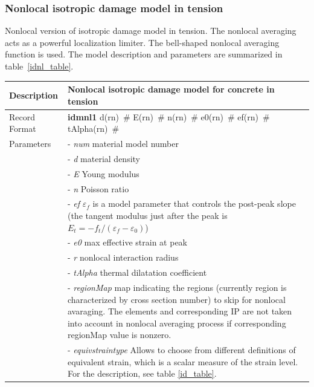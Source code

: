 \documentclass[epsf,a4paper]{article}
\newcommand{\descitem}[1]{{\noindent \bf #1}}
\newcommand{\elemparam}[2]{{{#1\tiny (#2)}~\#}}
\newcommand{\param}[1]{{\it #1}}
\begin{document}
\subsubsection{Nonlocal isotropic damage model in tension}
Nonlocal version of isotropic damage model in tension. 
The nonlocal averaging acts as a powerful localization
limiter. The bell-shaped nonlocal averaging function is used.
The model description and parameters are summarized
in table~\ref{idnl_table}.


\begin{table}[h]                                                                
\begin{tabular}{|l|p{9cm}|}                                                      
\hline                                                                          
Description & Nonlocal isotropic damage model  for concrete in tension\\
\hline                                                                          
Record Format & \descitem{idmnl1} \elemparam{d}{rn} \elemparam{E}{rn}
\elemparam{n}{rn}  \elemparam{e0}{rn}
\elemparam{ef}{rn} \elemparam{tAlpha}{rn} \\
Parameters &- \param{num} material model number\\
&- \param{d} material density\\
&- \param{E} Young modulus\\
&- \param{n} Poisson ratio\\
&- \param{ef} $\varepsilon_f$ is a model parameter that controls
the post-peak slope (the tangent modulus just after the peak is
$E_t=-f_t/(\varepsilon_f-\varepsilon_0)$)\\
&- \param{e0} max effective strain at peak\\
&- \param{r} nonlocal interaction radius\\
&- \param{tAlpha} thermal dilatation coefficient\\
&- \param{regionMap} map indicating the regions (currently region is
characterized by cross section number) to skip for nonlocal
avaraging. The elements and corresponding IP are not taken into
account in nonlocal averaging process if corresponding regionMap
value is nonzero.\\
&- \param{equivstraintype} Allows to choose from different definitions
of equivalent strain, which is a scalar measure of the strain
level. For the description, see table \ref{id_table}.\\

\end{tabular}
\end{table}
\end{document}
